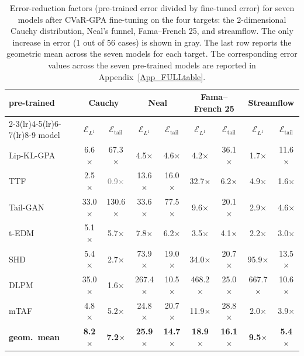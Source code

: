 \begin{table}
\vspace{-1.1\baselineskip}
\centering
\caption{
Error-reduction factors (pre-trained error divided by fine-tuned error) for seven models after CVaR-GPA fine-tuning on the four targets: the 2-dimensional Cauchy distribution, Neal's funnel, Fama--French 25, and streamflow. The only increase in error ($1$ out of $56$ cases) is shown in gray. The last row reports the geometric mean across the seven models for each target. The corresponding error values across the seven pre-trained models are reported in Appendix~\ref{App_FULLtable}.
}
\label{tab:headline:summary}
\begin{tabular}{@{}l cc cc cc cc@{}}\toprule
pre-trained & \multicolumn{2}{c}{Cauchy} & \multicolumn{2}{c}{Neal} & \multicolumn{2}{c}{Fama--French 25} & \multicolumn{2}{c}{Streamflow}\\
\cmidrule(lr){2-3}\cmidrule(lr){4-5}\cmidrule(lr){6-7}\cmidrule(lr){8-9}
model & $\mathcal{E}_{L^1}$ & $\mathcal{E}_{\mathrm{tail}}$ & $\mathcal{E}_{L^1}$ & $\mathcal{E}_{\mathrm{tail}}$ & $\mathcal{E}_{L^1}$ & $\mathcal{E}_{\mathrm{tail}}$ & $\mathcal{E}_{L^1}$ & $\mathcal{E}_{\mathrm{tail}}$\\
\midrule
Lip-KL-GPA & 6.6$\times$ & 67.3$\times$ & 4.5$\times$ & 4.6$\times$ & 4.2$\times$ & {36.1}$\times$ & {1.7}$\times$ & {11.6}$\times$\\
TTF & 2.5$\times$ & \textcolor{gray}{0.9$\times$} & 13.6$\times$ & 16.0$\times$ & {32.7}$\times$ & {6.2}$\times$ & {4.9}$\times$ & 1.6$\times$\\
Tail-GAN & 33.0$\times$ & 130.6$\times$ & 33.6$\times$ & 77.5$\times$ & {9.6}$\times$ & {20.1}$\times$ & {2.9}$\times$ & {4.6}$\times$\\
t-EDM & 5.1$\times$ & 5.7$\times$ & 7.8$\times$ & 6.2$\times$ & 3.5$\times$ & {4.1}$\times$ & 2.2$\times$ & {3.0}$\times$\\
SHD & 5.4$\times$ & 2.7$\times$ & 73.9$\times$ & 19.0$\times$ & {34.0}$\times$ & {20.7}$\times$ & {95.9}$\times$ & {13.5}$\times$\\
DLPM & 35.0$\times$ & 1.6$\times$ & 267.4$\times$ & 10.5$\times$ & {468.2}$\times$ & {25.0}$\times$ & 667.7$\times$ & {10.6}$\times$\\
mTAF & 4.8$\times$ & 5.2$\times$ & 24.8$\times$ & 20.7$\times$ & {11.9}$\times$ & {28.8}$\times$ & 2.0$\times$ & {3.9}$\times$\\
\midrule
\textbf{geom.\ mean} & \textbf{8.2}$\times$ & \textbf{7.2}$\times$ & \textbf{25.9}$\times$ & \textbf{14.7}$\times$ & \textbf{{18.9}}$\times$ & \textbf{{16.1}}$\times$ & \textbf{{9.5}}$\times$ & \textbf{{5.4}}$\times$\\
\bottomrule\end{tabular}
\end{table}
